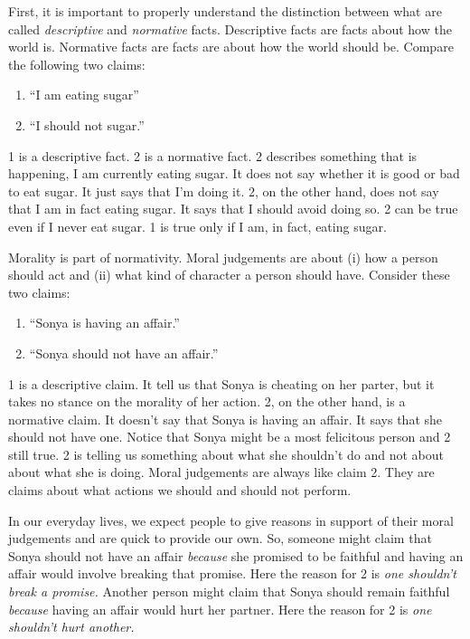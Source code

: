 \documentclass[]{article}
\begin{document}
First, it is important to properly understand the distinction between
what are called \emph{descriptive} and \emph{normative} facts.
Descriptive facts are facts about how the world is. Normative facts are
facts are about how the world should be. Compare the following two
claims:

\begin{enumerate}
\def\labelenumi{\arabic{enumi}.}
\itemsep1pt\parskip0pt
\item
  ``I am eating sugar''
\item
  ``I should not sugar.''
\end{enumerate}

1 is a descriptive fact. 2 is a normative fact. 2 describes something
that is happening, I am currently eating sugar. It does not say whether
it is good or bad to eat sugar. It just says that I'm doing it. 2, on
the other hand, does not say that I am in fact eating sugar. It says
that I should avoid doing so. 2 can be true even if I never eat sugar. 1
is true only if I am, in fact, eating sugar.

Morality is part of normativity. Moral judgements are about (i) how a
person should act and (ii) what kind of character a person should have.
Consider these two claims:

\begin{enumerate}
\def\labelenumi{\arabic{enumi}.}
\itemsep1pt\parskip0pt
\item
  ``Sonya is having an affair.''\\
\item
  ``Sonya should not have an affair.''
\end{enumerate}

1 is a descriptive claim. It tell us that Sonya is cheating on her
parter, but it takes no stance on the morality of her action. 2, on the
other hand, is a normative claim. It doesn't say that Sonya is having an
affair. It says that she should not have one. Notice that Sonya might be
a most felicitous person and 2 still true. 2 is telling us something
about what she shouldn't do and not about about what she is doing. Moral
judgements are always like claim 2. They are claims about what actions
we should and should not perform.

In our everyday lives, we expect people to give reasons in support of
their moral judgements and are quick to provide our own. So, someone
might claim that Sonya should not have an affair \emph{because} she
promised to be faithful and having an affair would involve breaking that
promise. Here the reason for 2 is \emph{one shouldn't break a promise.}
Another person might claim that Sonya should remain faithful
\emph{because} having an affair would hurt her partner. Here the reason
for 2 is \emph{one shouldn't hurt another.}
\end{document}
